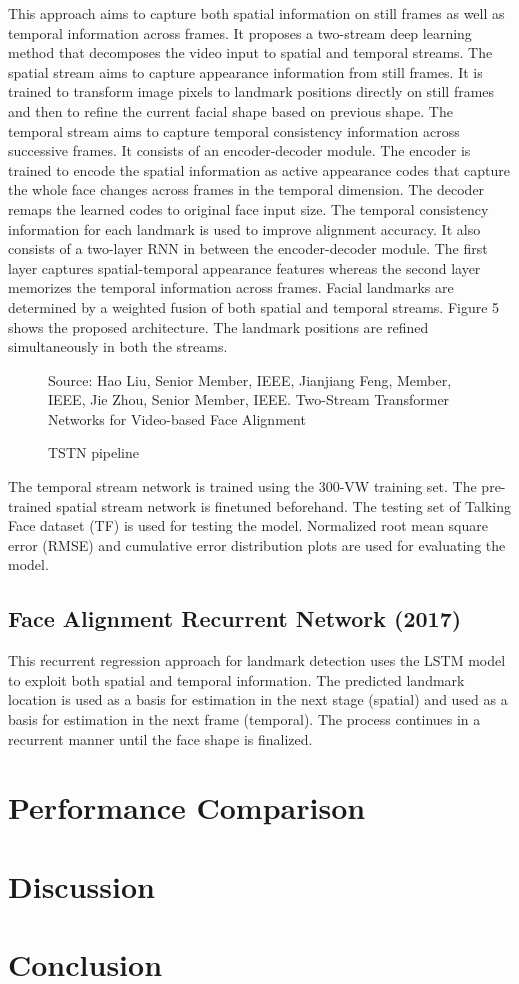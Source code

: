 \documentclass{llncs}
\begin{document}
This approach aims to capture both spatial information on still frames as well as temporal information across frames. It proposes a two-stream deep learning method that decomposes the video input to spatial and temporal streams. The spatial stream aims to capture appearance information from still frames. It is trained to transform image pixels to landmark positions directly on still frames and then to refine the current facial shape based on previous shape. The temporal stream aims to capture temporal consistency information across successive frames. It consists of an encoder-decoder module. The encoder is trained to encode the spatial information as active appearance codes that capture the whole face changes across frames in the temporal dimension. The decoder remaps the learned codes to original face input size. The temporal consistency information for each landmark is used to improve alignment accuracy. It also consists of a two-layer RNN in between the encoder-decoder module. The first layer captures spatial-temporal appearance features whereas the second layer memorizes the temporal information across frames. Facial landmarks are determined by a weighted fusion of both spatial and temporal streams. Figure 5 shows the proposed architecture. The landmark positions are refined simultaneously in both the streams.

\begin{figure}
%
{Source: Hao Liu, Senior Member, IEEE, Jianjiang Feng, Member, IEEE, Jie Zhou, Senior Member, IEEE. Two-Stream Transformer Networks for Video-based Face Alignment}
\caption{TSTN pipeline}
\end{figure}

The temporal stream network is trained using the 300-VW training set. The pre-trained spatial stream network is finetuned beforehand. The testing set of Talking Face dataset (TF) is used for testing the model. Normalized root mean square error (RMSE) and cumulative error distribution plots are used for evaluating the model.


\subsection{Face Alignment Recurrent Network (2017) \cite{farn}}

This recurrent regression approach for landmark detection uses the LSTM model to exploit both spatial and temporal information. The predicted landmark location is used as a basis for estimation in the next stage (spatial) and used as a basis for estimation in the next frame (temporal). The process continues in a recurrent manner until the face shape is finalized. 





\section{Performance Comparison}


\section{Discussion}


\section{Conclusion}


%

%
%


%
\end{document}
